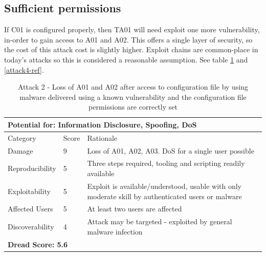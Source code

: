 \documentclass [11pt, proquest] {uwthesis}[2020/02/24]
\begin{document}
\subsection{Sufficient permissions}
If C01 is configured properly, then TA01 will need exploit one more vulnerability, in-order to gain access to A01 and A02. This offers a single layer of security, so the cost of this attack cost is slightly higher. Exploit chains are common-place in today's attacks so this is considered a reasonable assumption.  
See table \ref{attack2-ref} and \ref{attack4-ref}.
\begin{table}[H]
\label{attack2-ref}
\begin{tabular}{|m{3cm}|m{.9cm}|p{27em} |}
\multicolumn{3}{l}{Potential for: Information Disclosure, Spoofing, DoS}                   \\
\hline
Category & Score & Rationale \\
\hline
Damage          & 9     & Loss of A01, A02, A03. DoS for a single user possible            \\
\hline
Reproducibility & 5     & Three steps required, tooling and scripting readily available    \\
\hline
Exploitability & 5      & Exploit is available/understood, usable with only moderate skill by authenticated users or malware \\
\hline
Affected Users  & 5     & At least two users are affected                      \\
\hline
Discoverability & 4     & Attack may be targeted - exploited by general malware infection \\
\hline
\multicolumn{3}{l}{\textbf{Dread Score: 5.6}} 
\end{tabular}
\caption{Attack 2 - Loss of A01 and A02 after access to configuration file by using malware delivered using a known vulnerability and the configuration file permissions are correctly set}
\end{table}
\end{document}
